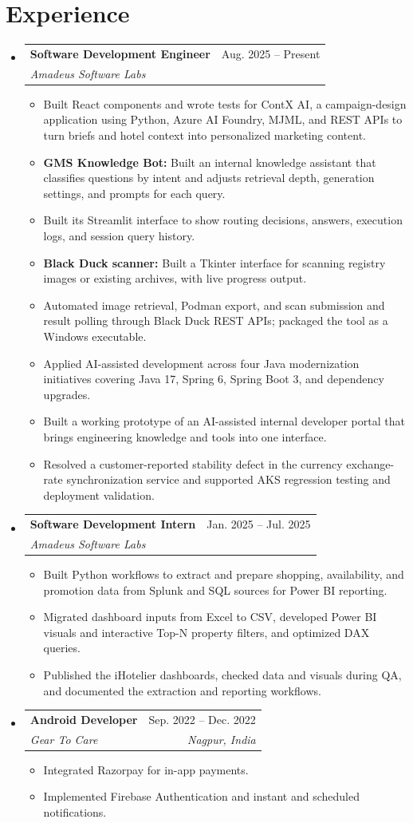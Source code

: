 \documentclass[a4paper,11pt]{article}
\makeatletter
\newcommand{\entry}[4]{\item\begin{tabularx}{\textwidth}{@{}Xr@{}}\textbf{#1}& #2\\\textit{\small #3}&\textit{\small #4}\end{tabularx}\vspace{-5pt}}
\newcommand{\bulletpoint}[1]{\item\small{#1}}
\makeatother
\begin{document}
\section{Experience}
\begin{itemize}[leftmargin=0in,label={}]
  \entry{Software Development Engineer}{Aug. 2025 -- Present}{Amadeus Software Labs}{}
  \begin{itemize}
    \bulletpoint{Built React components and wrote tests for ContX AI, a campaign-design application using Python, Azure AI Foundry, MJML, and REST APIs to turn briefs and hotel context into personalized marketing content.}
    \bulletpoint{\textbf{GMS Knowledge Bot:} Built an internal knowledge assistant that classif{}ies questions by intent and adjusts retrieval depth, generation settings, and prompts for each query.}
    \bulletpoint{Built its Streamlit interface to show routing decisions, answers, execution logs, and session query history.}
    \bulletpoint{\textbf{Black Duck scanner:} Built a Tkinter interface for scanning registry images or existing archives, with live progress output.}
    \bulletpoint{Automated image retrieval, Podman export, and scan submission and result polling through Black Duck REST APIs; packaged the tool as a Windows executable.}
    \bulletpoint{Applied AI-assisted development across four Java modernization initiatives covering Java 17, Spring 6, Spring Boot 3, and dependency upgrades.}
    \bulletpoint{Built a working prototype of an AI-assisted internal developer portal that brings engineering knowledge and tools into one interface.}
    \bulletpoint{Resolved a customer-reported stability defect in the currency exchange-rate synchronization service and supported AKS regression testing and deployment validation.}
  \end{itemize}
  \entry{Software Development Intern}{Jan. 2025 -- Jul. 2025}{Amadeus Software Labs}{}
  \begin{itemize}
    \bulletpoint{Built Python workf{}lows to extract and prepare shopping, availability, and promotion data from Splunk and SQL sources for Power BI reporting.}
    \bulletpoint{Migrated dashboard inputs from Excel to CSV, developed Power BI visuals and interactive Top-N property f{}ilters, and optimized DAX queries.}
    \bulletpoint{Published the iHotelier dashboards, checked data and visuals during QA, and documented the extraction and reporting workf{}lows.}
  \end{itemize}
  \entry{Android Developer}{Sep. 2022 -- Dec. 2022}{Gear To Care}{Nagpur, India}
  \begin{itemize}
    \bulletpoint{Integrated Razorpay for in-app payments.}
    \bulletpoint{Implemented Firebase Authentication and instant and scheduled notif{}ications.}
  \end{itemize}
\end{itemize}
\end{document}
